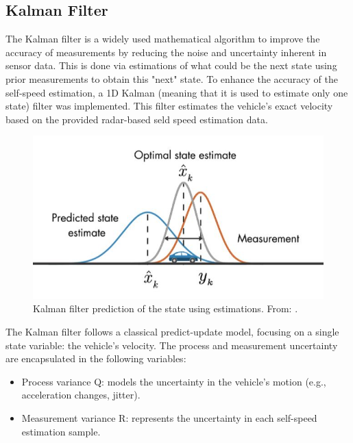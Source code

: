 \subsection{Kalman Filter}
The Kalman filter is a widely used mathematical algorithm to improve the accuracy of measurements by reducing the noise and uncertainty inherent in sensor data. This is done via estimations of what could be the next state using prior measurements to obtain this "next" state. 
To enhance the accuracy of the self-speed estimation, a 1D Kalman (meaning that it is used to estimate only one state) filter was implemented.
This filter estimates the vehicle's exact velocity based on the provided radar-based seld speed estimation data.
\begin{figure}[!htbp]
    \centering
    \includegraphics[width=1.0\linewidth]{images/kalman_2.jpg}
    \caption{Kalman filter prediction of the state using estimations. From: \cite{mathworks_kalman}.}
    \label{fig: Kalman filter prediction of the state using estimations.}
\end{figure}
\FloatBarrier\noindent

The Kalman filter follows a classical predict-update model, focusing on a single state variable: the vehicle’s velocity. The process and measurement uncertainty are encapsulated in the following variables:
\begin{itemize}
    \item Process variance Q: models the uncertainty in the vehicle’s motion (e.g., acceleration changes, jitter).
    \item Measurement variance R: represents the uncertainty in each self-speed estimation sample.
\end{itemize}

